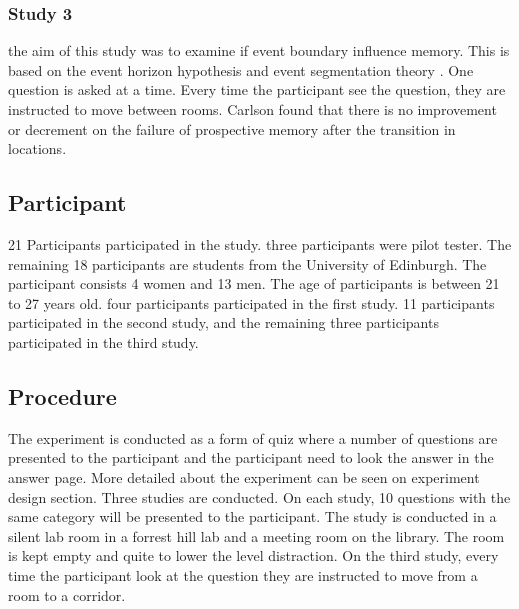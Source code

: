 \subsubsection{Study 3}
the aim of this study was to examine if event boundary influence memory. This is based on the event horizon hypothesis \citep{Radvansky2010} and
event segmentation theory \citep{Kurby2008}. One question is asked at a time.
Every time the participant see the question, they are instructed to move between rooms.
Carlson found that there is no improvement or decrement on the failure of prospective memory after the transition in locations.

%

\subsection{Participant}
21 Participants participated in the study. three participants were pilot tester.
The remaining 18 participants are students from the University of Edinburgh.
The participant consists 4 women and 13 men. The age of participants is between 21 to 27 years old.
four participants participated in the first study. 11 participants participated in the second study,
and the remaining three participants participated in the third study.


\subsection{Procedure}
The experiment is conducted as a form of quiz where a number of questions are presented to the participant and the participant need to look the answer in the answer page.
More detailed about the experiment can be seen on experiment design section.
Three studies are conducted. On each study, 10 questions with the same category will be presented to the participant. The study is conducted in a silent lab
 room in a forrest hill lab and a meeting room on the library. The room is kept empty and quite to lower the level distraction.
On the third study, every time the participant look at the question they are instructed to move from a room to a corridor.

